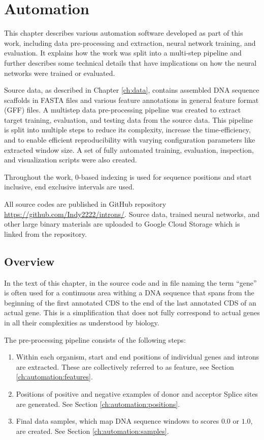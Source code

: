 \chapter{\label{ch:automation}Automation}

\minitoc

This chapter describes various automation software developed as part of this
work, including data pre-processing and extraction, neural network training,
and evaluation. It explains how the work was split into a multi-step pipeline
and further describes some technical details that have implications on how the
neural networks were trained or evaluated.

Source data, as described in Chapter \ref{ch:data}, contains assembled DNA
sequence scaffolds in FASTA files and various feature annotations in general
feature format (GFF) files. A multistep data pre-processing pipeline was
created to extract target training, evaluation, and testing data from the
source data. This pipeline is split into multiple steps to reduce its
complexity, increase the time-efficiency, and to enable efficient
reproducibility with varying configuration parameters like extracted window
size. A set of fully automated training, evaluation, inspection, and
visualization scripts were also created.

Throughout the work, 0-based indexing is used for sequence positions and start
inclusive, end exclusive intervals are used.

All source codes are published in GitHub repository
\url{https://github.com/Indy2222/introns/}. Source data, trained neural
networks, and other large binary materials are uploaded to Google Cloud Storage
which is linked from the repository.

\section{\label{ch:automation:overview}Overview}

In the text of this chapter, in the source code and in file naming the term
``gene'' is often used for a continuous area withing a DNA sequence that spans
from the beginning of the first annotated CDS to the end of the last annotated
CDS of an actual gene. This is a simplification that does not fully correspond
to actual genes in all their complexities as understood by biology.

The pre-processing pipeline consists of the following steps:

\begin{enumerate}
  \item Within each organism, start and end positions of individual genes and
    introns are extracted. These are collectively referred to as feature, see
    Section \ref{ch:automation:features}.
  \item Positions of positive and negative examples of donor and acceptor
    Splice sites are generated. See Section \ref{ch:automation:positions}.
  \item Final data samples, which map DNA sequence windows to scores $0.0$ or
    $1.0$, are created. See Section \ref{ch:automation:samples}.
\end{enumerate}

